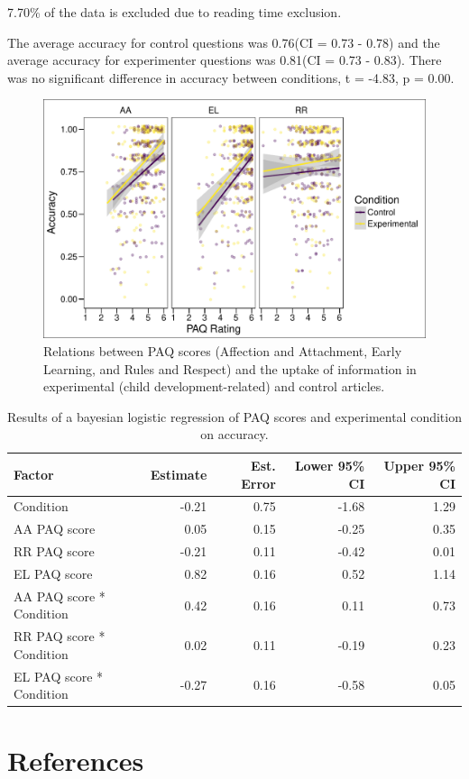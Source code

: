 \documentclass[floatsintext,man]{apa6}
\theoremstyle{definition}
\theoremstyle{definition}
\theoremstyle{definition}
\theoremstyle{remark}
\begin{document}
7.70\% of the data is excluded due to reading time exclusion.

The average accuracy for control questions was 0.76(CI = 0.73 - 0.78)
and the average accuracy for experimenter questions was 0.81(CI = 0.73 -
0.83). There was no significant difference in accuracy between
conditions, t = -4.83, p = 0.00.

\begin{figure}
\centering
\includegraphics{PAQ_paper_files/figure-latex/uptake-1.pdf}
\caption{\label{fig:uptake}Relations between PAQ scores (Affection and
Attachment, Early Learning, and Rules and Respect) and the uptake of
information in experimental (child development-related) and control
articles.}
\end{figure}

\begin{table}[h]
\centering
\begin{tabular}{lrrrr}
  \hline
Factor & Estimate & Est. Error & Lower 95\% CI & Upper 95\% CI \\ 
  \hline
Condition & -0.21 & 0.75 & -1.68 & 1.29 \\ 
  AA PAQ score & 0.05 & 0.15 & -0.25 & 0.35 \\ 
  RR PAQ score & -0.21 & 0.11 & -0.42 & 0.01 \\ 
  EL PAQ score & 0.82 & 0.16 & 0.52 & 1.14 \\ 
  AA PAQ score * Condition & 0.42 & 0.16 & 0.11 & 0.73 \\ 
  RR PAQ score * Condition & 0.02 & 0.11 & -0.19 & 0.23 \\ 
  EL PAQ score * Condition & -0.27 & 0.16 & -0.58 & 0.05 \\ 
   \hline
\end{tabular}
\caption{Results of a bayesian logistic regression of PAQ scores and experimental condition on accuracy.} 
\end{table}

\newpage

\section{References}\label{references}

\begingroup
\setlength{\parindent}{-0.5in} \setlength{\leftskip}{0.5in}

\hypertarget{refs}{}

\endgroup
\end{document}
